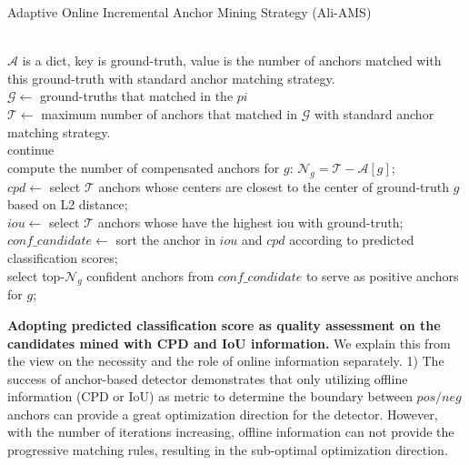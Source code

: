 \documentclass[10pt,twocolumn,letterpaper]{article}
\begin{document}
\begin{algorithm}[t!]
\small
\caption{Adaptive Online Incremental Anchor Mining Strategy (Ali-AMS)} 
\label{alg:ali_ams} 
\begin{algorithmic}[1]
\REQUIRE ~~\\
$\mathcal{A}$ is a dict, key is ground-truth, value is the number of anchors matched with this ground-truth with standard anchor matching strategy. \\
\vspace{2mm}
\STATE $\mathcal{G} \leftarrow{}$ ground-truths that matched in the $pi$ \\
\STATE $\mathcal{T} \leftarrow{}$ maximum number of anchors that matched in $\mathcal{G}$ with standard anchor matching strategy. \\
\STATE continue
\ENDIF \\
\STATE compute the number of compensated anchors for $g$: $\mathcal{N}_g = \mathcal{T} - \mathcal{A}[g]$;  \\
\STATE $cpd \leftarrow{}$ select $\mathcal{T}$ anchors whose centers are closest to the center of ground-truth $g$ based on L2 distance; \\
\STATE $iou \leftarrow{}$ select $\mathcal{T}$ anchors whose have the highest iou with ground-truth; \\
\STATE $conf\_candidate \leftarrow{}$ sort the anchor in $iou$ and $cpd$ according to predicted classification scores; \\
\STATE  select top-$\mathcal{N}_g$ confident anchors from $conf\_condidate$ to serve as positive anchors for $g$; \\ 
\ENDFOR
\ENDFOR 

\end{algorithmic}
\end{algorithm}
\noindent\textbf{Adopting predicted classification score as quality assessment on the candidates mined with CPD and IoU information.} 
We explain this from the view on the necessity and the role of online information separately.
1) The success of anchor-based detector demonstrates that only utilizing offline information (CPD or IoU) as metric to determine the boundary between $pos/neg$ anchors can provide a great optimization direction for the detector. However, with the number of iterations increasing, offline information  can not provide the progressive matching rules, resulting in the sub-optimal optimization direction.
\end{document}
